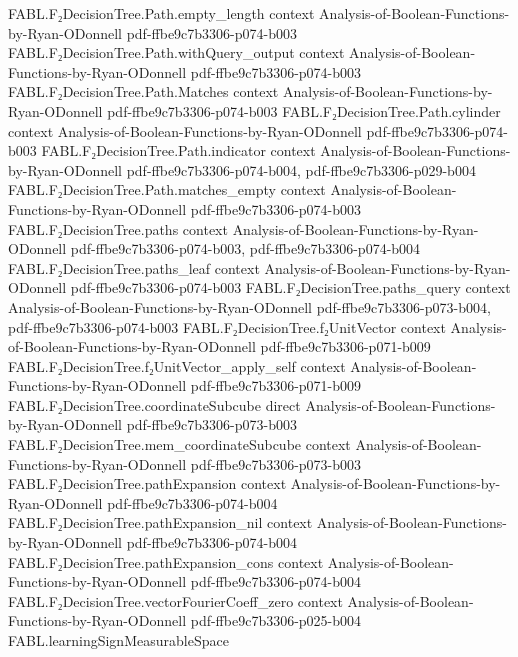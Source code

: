 \begin{theorem}
\proofstep
  {FABL.F₂DecisionTree.Path.empty_length}
  {context}
  {Analysis-of-Boolean-Functions-by-Ryan-ODonnell}
  {pdf-ffbe9c7b3306-p074-b003}
\proofstep
  {FABL.F₂DecisionTree.Path.withQuery_output}
  {context}
  {Analysis-of-Boolean-Functions-by-Ryan-ODonnell}
  {pdf-ffbe9c7b3306-p074-b003}
\proofstep
  {FABL.F₂DecisionTree.Path.Matches}
  {context}
  {Analysis-of-Boolean-Functions-by-Ryan-ODonnell}
  {pdf-ffbe9c7b3306-p074-b003}
\proofstep
  {FABL.F₂DecisionTree.Path.cylinder}
  {context}
  {Analysis-of-Boolean-Functions-by-Ryan-ODonnell}
  {pdf-ffbe9c7b3306-p074-b003}
\proofstep
  {FABL.F₂DecisionTree.Path.indicator}
  {context}
  {Analysis-of-Boolean-Functions-by-Ryan-ODonnell}
  {pdf-ffbe9c7b3306-p074-b004,
    pdf-ffbe9c7b3306-p029-b004}
\proofstep
  {FABL.F₂DecisionTree.Path.matches_empty}
  {context}
  {Analysis-of-Boolean-Functions-by-Ryan-ODonnell}
  {pdf-ffbe9c7b3306-p074-b003}
\proofstep
  {FABL.F₂DecisionTree.paths}
  {context}
  {Analysis-of-Boolean-Functions-by-Ryan-ODonnell}
  {pdf-ffbe9c7b3306-p074-b003,
    pdf-ffbe9c7b3306-p074-b004}
\proofstep
  {FABL.F₂DecisionTree.paths_leaf}
  {context}
  {Analysis-of-Boolean-Functions-by-Ryan-ODonnell}
  {pdf-ffbe9c7b3306-p074-b003}
\proofstep
  {FABL.F₂DecisionTree.paths_query}
  {context}
  {Analysis-of-Boolean-Functions-by-Ryan-ODonnell}
  {pdf-ffbe9c7b3306-p073-b004,
    pdf-ffbe9c7b3306-p074-b003}
\proofstep
  {FABL.F₂DecisionTree.f₂UnitVector}
  {context}
  {Analysis-of-Boolean-Functions-by-Ryan-ODonnell}
  {pdf-ffbe9c7b3306-p071-b009}
\proofstep
  {FABL.F₂DecisionTree.f₂UnitVector_apply_self}
  {context}
  {Analysis-of-Boolean-Functions-by-Ryan-ODonnell}
  {pdf-ffbe9c7b3306-p071-b009}
\proofstep
  {FABL.F₂DecisionTree.coordinateSubcube}
  {direct}
  {Analysis-of-Boolean-Functions-by-Ryan-ODonnell}
  {pdf-ffbe9c7b3306-p073-b003}
\proofstep
  {FABL.F₂DecisionTree.mem_coordinateSubcube}
  {context}
  {Analysis-of-Boolean-Functions-by-Ryan-ODonnell}
  {pdf-ffbe9c7b3306-p073-b003}
\proofstep
  {FABL.F₂DecisionTree.pathExpansion}
  {context}
  {Analysis-of-Boolean-Functions-by-Ryan-ODonnell}
  {pdf-ffbe9c7b3306-p074-b004}
\proofstep
  {FABL.F₂DecisionTree.pathExpansion_nil}
  {context}
  {Analysis-of-Boolean-Functions-by-Ryan-ODonnell}
  {pdf-ffbe9c7b3306-p074-b004}
\proofstep
  {FABL.F₂DecisionTree.pathExpansion_cons}
  {context}
  {Analysis-of-Boolean-Functions-by-Ryan-ODonnell}
  {pdf-ffbe9c7b3306-p074-b004}
\proofstep
  {FABL.F₂DecisionTree.vectorFourierCoeff_zero}
  {context}
  {Analysis-of-Boolean-Functions-by-Ryan-ODonnell}
  {pdf-ffbe9c7b3306-p025-b004}
\proofstep
  {FABL.learningSignMeasurableSpace}

\end{theorem}
